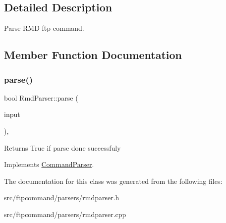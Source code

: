 \subsection{Detailed Description}
Parse R\+MD ftp command. 

\subsection{Member Function Documentation}
\mbox{\label{classRmdParser_a19bc9f3a082934c2e8eb9eb8d8aee5f3}} 
\subsubsection{\texorpdfstring{parse()}{parse()}}
{\footnotesize\ttfamily bool Rmd\+Parser\+::parse (\begin{DoxyParamCaption}\item[{const Q\+String \&}]{input }\end{DoxyParamCaption})\hspace{0.3cm}{\ttfamily [override]}, {\ttfamily [virtual]}}

\begin{DoxyReturn}{Returns}
True if parse done successfuly 
\end{DoxyReturn}


Implements \hyperlink{classCommandParser_a5ed0855947a9b4500329f29b8123f2ea}{Command\+Parser}.



The documentation for this class was generated from the following files\+:\begin{DoxyCompactItemize}
\item 
src/ftpcommand/parsers/rmdparser.\+h\item 
src/ftpcommand/parsers/rmdparser.\+cpp\end{DoxyCompactItemize}
